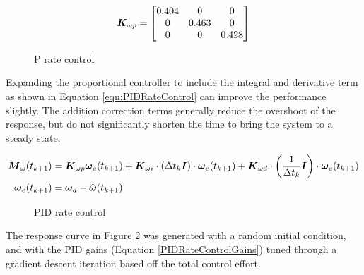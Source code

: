 \begin{equation}
  \boldsymbol{K}_{\omega p} = \begin{bmatrix} 0.404 & 0 & 0 \\ 0 & 0.463 & 0 \\ 0 & 0 & 0.428 \end{bmatrix}
\end{equation}

\begin{figure}[H]
  \centerline{}
  \caption{P rate control}
  \label{fig:PRateControl}
\end{figure}

Expanding the proportional controller to include the integral and derivative term as shown in Equation \ref{eqn:PIDRateControl} can improve the performance slightly.  The addition correction terms generally reduce the overshoot of the response, but do not significantly shorten the time to bring the system to a steady state.

\begin{equation}
  \begin{aligned}
    \boldsymbol{M}_{\omega}(t_{k+1}) &= \boldsymbol{K}_{\omega p} \boldsymbol{\omega}_e(t_{k+1}) + \boldsymbol{K}_{\omega i} \cdot (\Delta t_k \boldsymbol{I})\cdot \boldsymbol{\omega}_e(t_{k+1}) + \boldsymbol{K}_{\omega d} \cdot \left(\frac{1}{\Delta t_k} \boldsymbol{I}\right) \cdot \boldsymbol{\omega}_e(t_{k+1}) \\
    \boldsymbol{\omega}_e(t_{k+1}) &= \boldsymbol{\omega}_d - \boldsymbol{\hat{\omega}}(t_{k+1}) \\
  \end{aligned}
  \label{eqn:PRateControl}
\end{equation}

\begin{figure}[H]
  \centerline{}
  \caption{PID rate control}
  \label{fig:PIDRateControl}
\end{figure}

The response curve in Figure \ref{fig:PIDRateControl} was generated with a random initial condition, and with the PID gains (Equation \ref{PIDRateControlGains}) tuned through a gradient descent iteration based off the total control effort.

